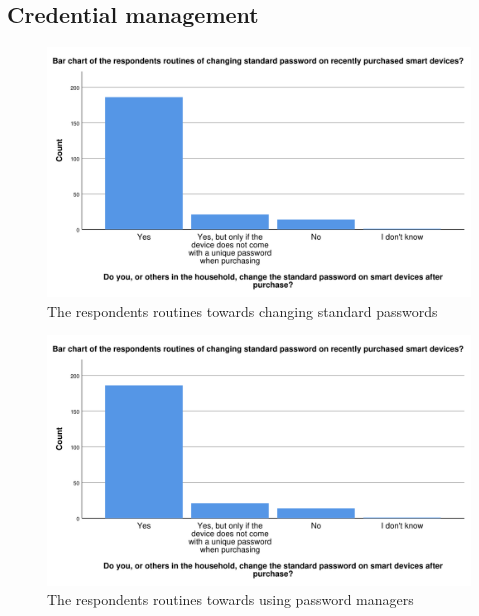 \subsection{Credential management}
\begin{figure}[H]
    \centering
    \includegraphics[scale=0.55]{figures/diagrams/standard_password.pdf}
    \caption{The respondents routines towards changing standard passwords}
    \label{fig:standard_password}
\end{figure}

\begin{figure}[H]
    \centering
    \includegraphics[scale=0.55]{figures/diagrams/standard_password.pdf}
    \caption{The respondents routines towards using password managers}
    \label{fig:standard_password}
\end{figure}

